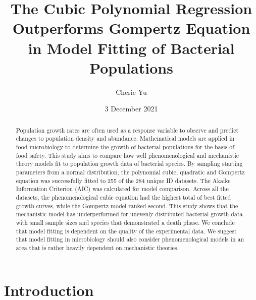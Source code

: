 \documentclass[11pt]{article}
\title{The Cubic Polynomial Regression Outperforms Gompertz Equation in Model Fitting of Bacterial Populations}
\author{Cherie Yu}
\affil{Imperial College London}
\date{3 December 2021}
\begin{document}
\maketitle

\pagebreak
\begin{abstract}
    Population growth rates are often used as a response variable to observe and predict changes to 
    population density and abundance. Mathematical models are applied in food microbiology to 
    determine the growth of bacterial populations for the basis of food safety. This study aims 
    to compare how well phenomenological and mechanistic theory models fit to population growth data 
    of bacterial species. By sampling starting parameters from a normal distribution, the polynomial 
    cubic, quadratic and Gompertz equation was successfully fitted to 255 of the 284 unique ID datasets. 
    The Akaike Information Criterion (AIC) was calculated for model comparison. Across all the datasets, 
    the phenomenological cubic equation had the highest total of best fitted growth curves, while 
    the Gompertz model ranked second. This study shows that the mechanistic model has underperformed 
    for unevenly distributed bacterial growth data with small sample sizes and species that demonstrated 
    a death phase. We conclude that model fitting is dependent on the quality of the 
    experimental data. We suggest that model fitting in microbiology should also consider 
    phenomenological models in an area that is rather heavily dependent on mechanistic theories. 
\end{abstract}

\section{Introduction}\\ 
\end{document}
